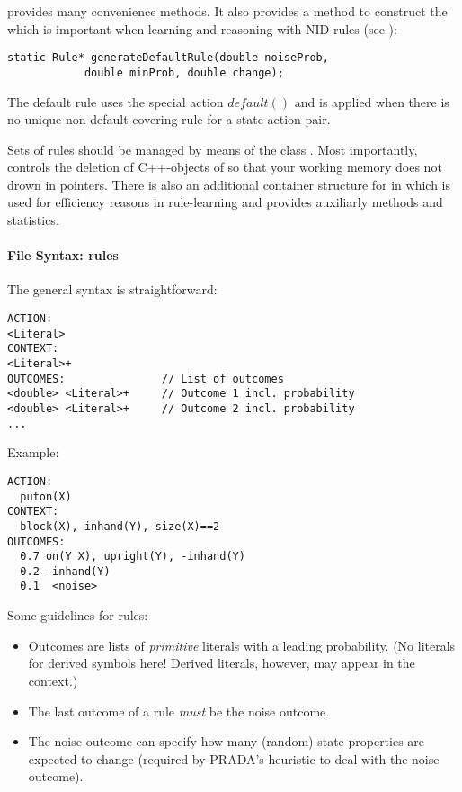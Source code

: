 \documentclass[10pt,twoside,twocolumn,fleqn]{article}
\begin{document}
 provides many convenience methods. It also provides a method
to construct the  which is important when
learning and reasoning with NID rules (see \cite{pasula07ai}):
\begin{lstlisting}
static Rule* generateDefaultRule(double noiseProb,
			double minProb, double change);
\end{lstlisting}
The default rule uses the special action $default()$ and is applied when
there is no unique non-default covering rule for a state-action pair.

Sets of rules should be managed by means of the class . Most
importantly,  controls the deletion of C++-objects of
 so that your working memory does not drown in 
pointers. There is also an additional container structure
 for  in  which is used
for efficiency reasons in rule-learning and provides auxiliarly methods
and statistics.


\paragraph{File Syntax: rules}

The general syntax is straightforward:
\begin{lstlisting}
ACTION:
<Literal>
CONTEXT:
<Literal>+
OUTCOMES:               // List of outcomes
<double> <Literal>+     // Outcome 1 incl. probability
<double> <Literal>+     // Outcome 2 incl. probability
...
\end{lstlisting}

Example:
\begin{lstlisting}
ACTION:
  puton(X)
CONTEXT:
  block(X), inhand(Y), size(X)==2
OUTCOMES:
  0.7 on(Y X), upright(Y), -inhand(Y)
  0.2 -inhand(Y)
  0.1  <noise>
\end{lstlisting}

Some guidelines for rules:
\begin{itemize}
\item Outcomes are lists of \emph{primitive} literals with a leading
probability. (No literals for derived symbols here! Derived literals,
however, may appear in the context.)
\item The last outcome of a rule \emph{must} be the noise outcome.
\item The noise outcome can specify how many (random) state properties
are expected to change (required by PRADA's heuristic to deal with the noise
outcome).
\end{itemize}
\end{document}
